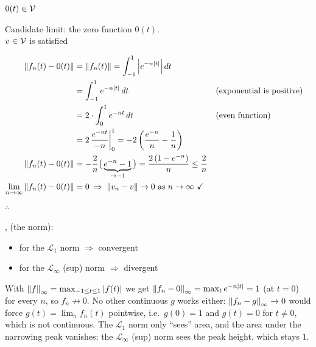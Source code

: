 \begin{example}
\begin{center}
\begin{minipage}{0.32\textwidth}
$0(t)\in\mathcal{V}$
\end{minipage}%
\begin{minipage}{0.64\textwidth}
Candidate limit: the zero function $0(t)$.\\ $v\in\mathcal{V}$ is satisfied \checkmark
\end{minipage}
\end{center}
\begin{align*}
\left\lVert f_n(t) - 0(t) \right\rVert &= \left\lVert f_n(t) \right\rVert = \int_{-1}^{1}\left|e^{-n|t|}\right|dt\\
&= \int_{-1}^{1} e^{-n|t|}\,dt
&&\text{(exponential is positive)}\\
&= 2\cdot\int_0^1 e^{-nt}\,dt
&&\text{(even function)}\\
&= 2\,\frac{e^{-nt}}{-n}\bigg|_0^1 = -2\left(\frac{e^{-n}}{n} - \frac1n\right)\\
\left\lVert f_n(t) - 0(t) \right\rVert &= -\frac{2}{n}\big(\underbrace{e^{-n} - 1}_{\to -1}\big) = \frac{2\,(1-e^{-n})}{n} \le \frac2n\\
\lim_{n\to\infty}\left\lVert f_n(t) - 0(t) \right\rVert &= 0 \;\Rightarrow\; \left\lVert v_n - v \right\rVert\to 0 \text{ as } n\to\infty \ \checkmark
\end{align*}
$\therefore$ 
\end{example}

\sep
{} (the norm):
\begin{itemize}[nosep]
\item for the $\mathcal{L}_1$ norm $\Rightarrow$ convergent
\item for the $\mathcal{L}_\infty$ (sup) norm $\Rightarrow$ divergent
\end{itemize}
\begin{insight}
With $\left\lVert f \right\rVert_\infty = \max_{-1\le t\le 1}|f(t)|$ we get $\left\lVert f_n - 0 \right\rVert_\infty = \max_t e^{-n|t|} = 1$ (at $t=0$) for every $n$, so $f_n\not\to 0$. No other continuous $g$ works either: $\left\lVert f_n - g \right\rVert_\infty\to0$ would force $g(t) = \lim_n f_n(t)$ pointwise, i.e.\ $g(0)=1$ and $g(t)=0$ for $t\neq0$, which is not continuous. The $\mathcal L_1$ norm only ``sees'' area, and the area under the narrowing peak vanishes; the $\mathcal L_\infty$ (sup) norm sees the peak height, which stays $1$.
\end{insight}

